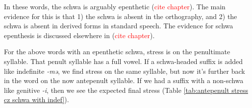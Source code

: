 \begin{table}[H]
	\centering
	\caption{Penultimate  stress when the final root syllable  has  a schwa, while penult has full vowel }
	\label{tab:penult stress cz schwa}
\end{table}

In these words, the schwa is arguably epenthetic (\textcolor{red}{cite chapter}). The main evidence for this is that 1) the schwa is absent in the orthography, and 2) the schwa is absent in derived forms in standard speech. The evidence for schwa epenthesis is discussed elsewhere in (\textcolor{red}{cite chapter}). 


For the above words with an epenthetic schwa, stress is on the penultimate syllable. That penult syllable has a full vowel. If a schwa-headed suffix is added like indefinite \textit{-mə},  we  find stress on the same syllable, but now it's further back in the word on the now antepenult syllable.   If we had a suffix with a non-schwa like genitive \textit{-i}, then we see the expected final stress (Table \ref{tab:antepenult stress cz schwa with indef}).  


